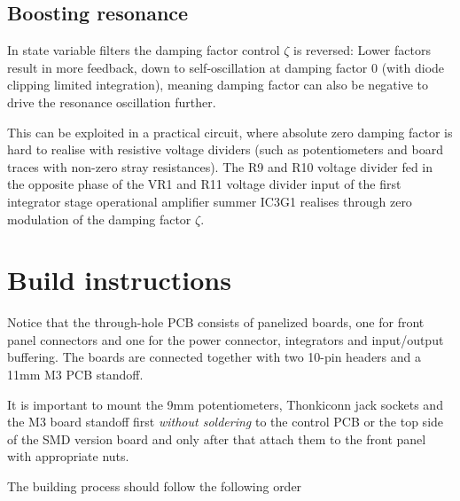 \documentclass{article}
\begin{document}
\subsection{Boosting resonance}

In state variable filters the damping factor control $\zeta$ is reversed: Lower factors result in more feedback, down to self-oscillation at damping factor 0 (with diode clipping limited integration), meaning damping factor can also be negative to drive the resonance oscillation further.\newline

This can be exploited in a practical circuit, where absolute zero damping factor is hard to realise with resistive voltage dividers (such as potentiometers and board traces with non-zero stray resistances). The R9 and R10 voltage divider fed in the opposite phase of the VR1 and R11 voltage divider input of the first integrator stage operational amplifier summer IC3G1 realises through zero modulation of the damping factor $\zeta$.

\section{Build instructions} \label{buildinstructions}

Notice that the through-hole PCB consists of panelized boards, one for front panel connectors and one for the power connector, integrators and input/output buffering. The boards are connected together with two 10-pin headers and a 11mm M3 PCB standoff.\newline

It is important to mount the 9mm potentiometers, Thonkiconn jack sockets and the M3 board standoff first \emph{without soldering} to the control PCB or the top side of the SMD version board and only after that attach them to the front panel with appropriate nuts. \newline


The building process should follow the following order
\end{document}
